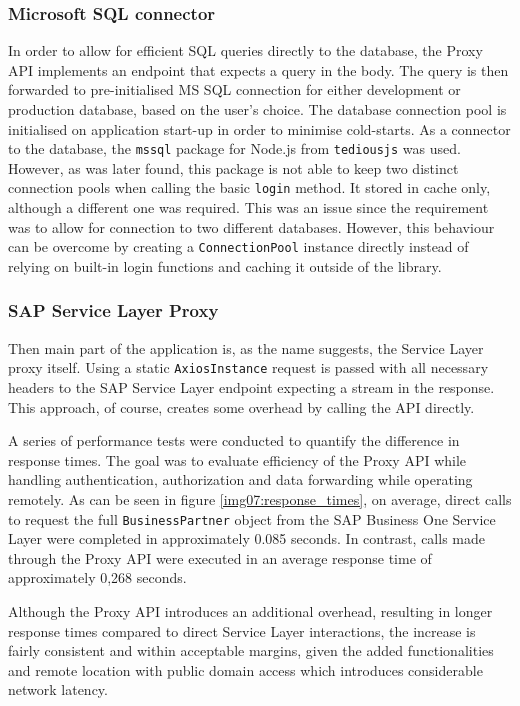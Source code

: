 \subsubsection{Microsoft SQL connector}
In order to allow for efficient SQL queries directly to the database, the Proxy API implements an endpoint that expects a query in the body.
The query is then forwarded to pre-initialised \ac{MS} SQL connection for either development or production database, based on the user's choice. 
The database connection pool is initialised on application start-up in order to minimise cold-starts.
As a connector to the database, the \texttt{mssql} package for Node.js from \texttt{tediousjs} was used. However, as was later found, this package is not able to keep two distinct connection pools when calling the basic \texttt{login} method.
It stored in cache only, although a different one was required. This was an issue since the requirement was to allow for connection to two different databases. 
However, this behaviour can be overcome by creating a \texttt{ConnectionPool} instance directly instead of relying on built-in login functions and caching it outside of the library.

\subsubsection{SAP Service Layer Proxy}
Then main part of the application is, as the name suggests, the Service Layer proxy itself. 
Using a static \texttt{AxiosInstance} request is passed with all necessary headers to the SAP Service Layer endpoint expecting a stream in the response.
This approach, of course, creates some overhead by calling the API directly. 

A series of performance tests were conducted to quantify the difference in response times. 
The goal was to evaluate efficiency of the Proxy API while handling authentication, authorization and data forwarding while operating remotely. 
As can be seen in figure \ref{img07:response_times}, on average, direct calls to request the full \texttt{BusinessPartner} object from the SAP Business One Service Layer were completed in approximately 0.085 seconds. 
In contrast, calls made through the Proxy API were executed in an average response time of approximately 0,268 seconds.

Although the Proxy API introduces an additional overhead, resulting in longer response times compared to direct Service Layer interactions, the increase is fairly consistent and within acceptable margins, given the added functionalities and remote location with public domain access which introduces considerable network latency.


